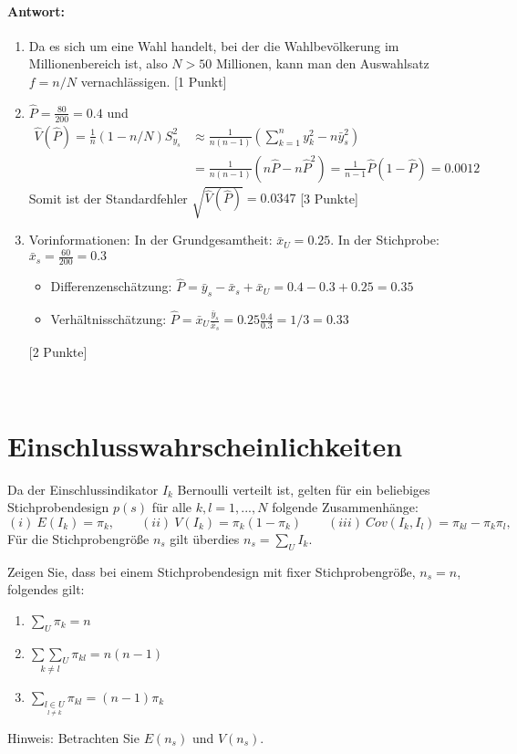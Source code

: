 \documentclass{article}
\begin{document}
\paragraph{Antwort:}
\begin{solution}
	[6 Punkte]
	\begin{enumerate}
		\item Da es sich um eine Wahl handelt, bei der die Wahlbevölkerung im Millionenbereich ist, also $N>50$ Millionen, kann man den Auswahlsatz $f=n/N$ vernachlässigen. [1 Punkt]
		\item $\hat{P} = \frac{80}{200}=0.4$ und 
		\begin{align*}
		\hat{V}(\hat{P}) = \frac{1}{n}(1-n/N)S_{y_s}^2 &\approx \frac{1}{n(n-1)}\left(\sum_{k=1}^n y_k^2 - n \bar{y}_s^2\right)\\
		&= \frac{1}{n(n-1)}\left(n \hat{P}-n\hat{P}^2\right) = \frac{1}{n-1}\hat{P}(1-\hat{P}) = 0.0012
		\end{align*}
		Somit ist der Standardfehler $\sqrt{\hat{V}(\hat{P})}=0.0347$ [3 Punkte]
		\item Vorinformationen: In der Grundgesamtheit: $\bar{x}_U = 0.25$. In der Stichprobe: $\bar{x}_s = \frac{60}{200} = 0.3$
		\begin{itemize}
			\item Differenzenschätzung: $\hat{P} = \bar{y}_s - \bar{x}_s + \bar{x}_U = 0.4-0.3+0.25 = 0.35$
			\item Verhältnisschätzung: $\hat{P}=\bar{x}_U \frac{\bar{y}_s}{\bar{x}_s} = 0.25 \frac{0.4}{0.3}=1/3=0.33$
		\end{itemize}
	[2 Punkte]
	\end{enumerate}
\end{solution}

~\newpage


\section{Einschlusswahrscheinlichkeiten}
Da der Einschlussindikator $I_k$ Bernoulli verteilt ist, gelten für ein beliebiges Stichprobendesign $p(s)$ für alle $k,l=1,...,N$ folgende Zusammenhänge:
$$(i)~ E(I_k)=\pi_k, \qquad (ii)~  V(I_k) = \pi_k(1-\pi_k) \qquad (iii)~ Cov(I_k,I_l)=\pi_{kl}-\pi_k \pi_l,$$
Für die Stichprobengröße $n_s$ gilt überdies $n_s =\sum_U I_k$.

Zeigen Sie, dass bei einem Stichprobendesign mit fixer Stichprobengröße, $n_s=n$, folgendes gilt:
\begin{enumerate}
\item $\sum_U \pi_k = n$
\item $\underset{k\neq l}{\sum\sum_U}\pi_{kl}=n(n-1)$
\item $\sum_{\underset{l\neq k}{l \in U}} \pi_{kl} = (n-1)\pi_k$
\end{enumerate}
Hinweis: Betrachten Sie $E(n_s)$ und $V(n_s)$.
\end{document}
